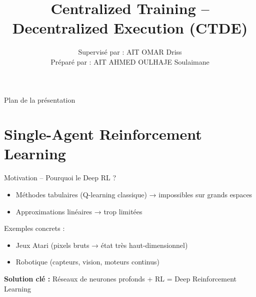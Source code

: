 \documentclass{beamer}
\title{Centralized Training -- Decentralized Execution (CTDE)}
\author{Supervisé par : AIT OMAR Driss\\
            Préparé par : AIT AHMED OULHAJE Soulaimane}
\institute{Master AIDC — FST Béni Mellal}
\begin{document}
\begin{frame}
\titlepage
\end{frame}

\begin{frame}{Plan de la présentation}
\tableofcontents
\end{frame}

\section{Single-Agent Reinforcement Learning}

\begin{frame}{Motivation – Pourquoi le Deep RL ?}
\begin{itemize}
    \item Méthodes tabulaires (Q-learning classique) → impossibles sur grands espaces
    \item Approximations linéaires → trop limitées
\end{itemize}

  

Exemples concrets :
\begin{itemize}
    \item Jeux Atari (pixels bruts → état très haut-dimensionnel)
    \item Robotique (capteurs, vision, moteurs continus)
\end{itemize}

 \centering
\textbf{Solution clé :} Réseaux de neurones profonds + RL = \alert{Deep Reinforcement Learning}
\end{frame}
\end{document}
